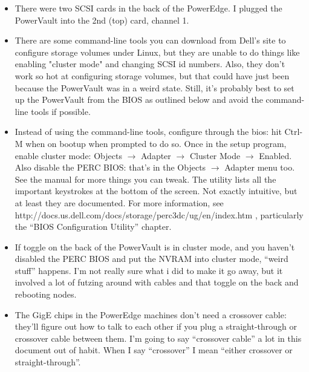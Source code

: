 \documentclass[11pt]{article}
\begin{document}
\begin{itemize}
\item There were two SCSI cards in the back of the PowerEdge. I plugged the
  PowerVault into the 2nd (top) card, channel 1.

\item There are some command-line tools you can download from Dell's
  site to configure storage volumes under Linux, but they are unable to
  do things like enabling "cluster mode" and changing SCSI id numbers.
  Also, they don't work so hot at configuring storage volumes, but that
  could have just been because the PowerVault was in a weird state.
  Still, it's probably best to set up the PowerVault from the BIOS as
  outlined below and avoid the command-line tools if possible.

\item Instead of using the command-line tools, configure through the
  bios: hit Ctrl-M when on bootup when prompted to do so.  Once in the
  setup program, enable cluster mode:
  Objects $\rightarrow$ Adapter $\rightarrow$ Cluster Mode $\rightarrow$
  Enabled.  Also disable the PERC BIOS: that's in the Objects
  $\rightarrow$ Adapter menu too.  See the manual for more things you
  can tweak.  The utility lists all the important keystrokes at the
  bottom of the screen.  Not exactly intuitive, but at least they are
  documented. For more information, see
  http://docs.us.dell.com/docs/storage/perc3dc/ug/en/index.htm ,
  particularly the ``BIOS Configuration Utility'' chapter.

\item If toggle on the back of the PowerVault is in cluster mode, and you
  haven't disabled the PERC BIOS and put the NVRAM into cluster mode,
  ``weird stuff'' happens.   I'm not really sure what i did to make it go
  away, but it involved a lot of futzing around with cables and that
  toggle on the back and rebooting nodes. 

\item The GigE chips in the PowerEdge machines don't need a crossover cable:
  they'll figure out how to talk to each other if you plug a
  straight-through or crossover cable between them.  I'm going to say
  ``crossover cable'' a lot in this document out of habit.  When I say
  ``crossover'' I mean ``either crossover or straight-through''.


\end{itemize}
\end{document}
